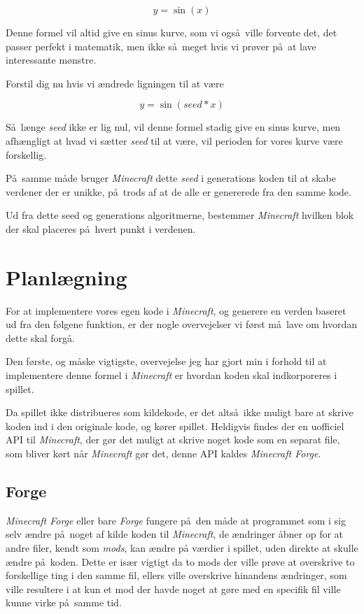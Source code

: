 \documentclass[a4paper,12pt]{report}
\begin{document}
		\[y = \sin (x)\]

		Denne formel vil altid give en sinus kurve, som vi ogs\aa \ ville forvente det, det passer perfekt i matematik, men ikke s\aa \ meget
		hvis vi pr\o ver p\aa \ at lave interessante m\o nstre.

		Forstil dig nu hvis vi \ae ndrede ligningen til at være

		\[y = \sin (seed * x)\]

		S\aa \ l\ae nge \emph{seed} ikke er lig nul, vil denne formel stadig give en sinus kurve, men afh\ae ngligt at hvad vi s\ae tter \emph{seed}
		til at v\ae re, vil perioden for vores kurve v\ae re forskellig.

		P\aa \ samme m\aa de bruger \emph{Minecraft} dette \emph{seed} i generations koden til at skabe verdener der er unikke, p\aa \ trods
		af at de alle er genererede fra den samme kode.

		Ud fra dette seed og generations algoritmerne, bestemmer \emph{Minecraft} hvilken blok der skal placeres p\aa \ hvert punkt
		i verdenen.
	\section{Planl\ae gning}
		For at implementere vores egen kode i \emph{Minecraft}, og generere en verden baseret ud fra den f\o lgene funktion, er der
		nogle overvejelser vi f\o rst m\aa \ lave om hvordan dette skal forg\aa .

		

		Den f\o rste, og m\aa ske vigtigste, overvejelse jeg har gjort min i forhold til at implementere denne formel i \emph{Minecraft}
		er hvordan koden skal indkorporeres i spillet.

		Da spillet ikke distribueres som kildekode, er det alts\aa \ ikke muligt bare at skrive koden ind i den originale kode, og k\o rer spillet.
		Heldigvis findes der en uofficiel API til \emph{Minecraft}, der g\o r det muligt at skrive noget kode som en separat file, som bliver k\o rt
		n\aa r \emph{Minecraft} g\o r det, denne API kaldes \emph{Minecraft Forge}.

		\subsection{Forge}
		\emph{Minecraft Forge} eller bare \emph{Forge} fungere p\aa \ den m\aa de at programmet som i sig selv \ae ndre p\aa \ noget af
		kilde koden til \emph{Minecraft}, de \ae ndringer \aa bner op for at andre filer, kendt som \emph{mods}, kan \ae ndre p\aa
		v\ae rdier i spillet, uden direkte at skulle \ae ndre p\aa \ koden. Dette er is\ae r vigtigt da to mods der ville pr\o ve at overskrive
		to forskellige ting i den samme fil, ellers ville overskrive hinandens \ae ndringer, som ville resultere i at kun et mod der havde noget
		at g\o re med en specifik fil ville kunne virke p\aa \ samme tid.
\end{document}
